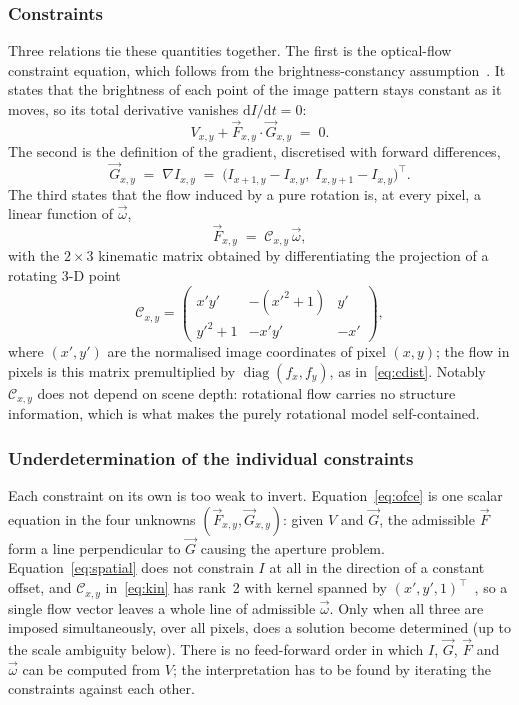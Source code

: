 \documentclass[journal]{IEEEtran}
\newcommand{\Imap}{I}
\newcommand{\Vmap}{V}
\newcommand{\Gmap}{\vec{G}}
\newcommand{\Fmap}{\vec{F}}
\newcommand{\Cmat}{\mathcal{C}}
\newcommand{\wvec}{\vec{\omega}}
\begin{document}
\subsubsection{Constraints}
Three relations tie these quantities together. The first is the optical-flow
constraint equation, which follows from the brightness-constancy assumption~\cite{horn1981}. It states that the brightness of each point of the image pattern stays constant as it moves, so its total derivative vanishes
$\mathrm{d}\Imap/\mathrm{d}t = 0$:
\begin{equation}
\Vmap_{x,y} + \Fmap_{x,y}\cdot\Gmap_{x,y} \;=\; 0 .
\label{eq:ofce}
\end{equation}
The second is the definition of the gradient, discretised with forward
differences,
\begin{equation}
\Gmap_{x,y} \;=\; \nabla \Imap_{x,y}
 \;=\; \big(\Imap_{x+1,y}-\Imap_{x,y},\; \Imap_{x,y+1}-\Imap_{x,y}\big)^{\!\top}.
\label{eq:spatial}
\end{equation}
The third states that the flow induced by a pure rotation is, at every pixel, a
linear function of $\wvec$,
\begin{equation}
\Fmap_{x,y} \;=\; \Cmat_{x,y}\,\wvec ,
\label{eq:kin}
\end{equation}
with the $2\times3$ kinematic matrix obtained by differentiating the projection
of a rotating 3-D point~\cite{martel2019thesis}
\begin{equation}
\Cmat_{x,y} =
\begin{pmatrix}
 x'y' & -(x'^2+1) & y' \\[2pt]
 y'^2+1 & -x'y' & -x'
\end{pmatrix},
\label{eq:cmat}
\end{equation}
where $(x',y')$ are the normalised image coordinates of pixel $(x,y)$; the
flow in pixels is this matrix premultiplied by $\operatorname{diag}(f_x,f_y)$,
as in~\eqref{eq:cdist}. Notably
$\Cmat_{x,y}$ does not depend on scene depth: rotational flow carries no
structure information, which is what makes the purely rotational model
self-contained.

\subsubsection{Underdetermination of the individual constraints}
Each constraint on its own is too weak to invert.
Equation~\eqref{eq:ofce} is one scalar equation in the four unknowns
$(\Fmap_{x,y},\Gmap_{x,y})$: given $\Vmap$ and $\Gmap$, the admissible $\Fmap$
form a line perpendicular to $\Gmap$ causing the aperture problem.
Equation~\eqref{eq:spatial} does not constrain $\Imap$ at all in the direction
of a constant offset, and $\Cmat_{x,y}$ in~\eqref{eq:kin} has rank~2 with kernel
spanned by $(x',y',1)^{\!\top}$~\cite{martel2019thesis}, so a single flow vector leaves a whole line of
admissible $\wvec$. Only when all three are imposed simultaneously, over all
pixels, does a solution become determined (up to the scale ambiguity below). There is no feed-forward order in
which $\Imap$, $\Gmap$, $\Fmap$ and $\wvec$ can be computed from $\Vmap$; the
interpretation has to be found by iterating the constraints against each other.
\end{document}
